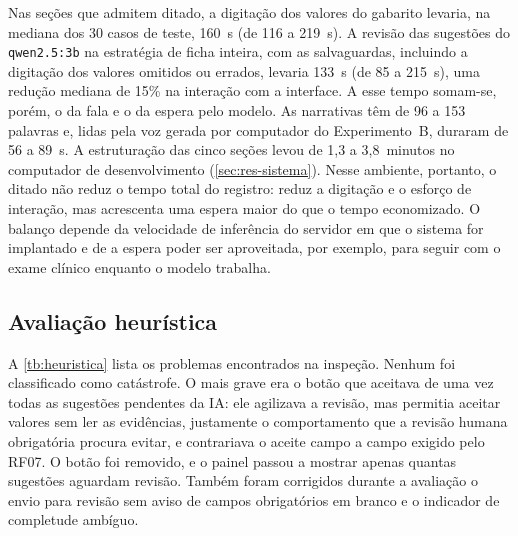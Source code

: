 Nas seções que admitem ditado, a digitação dos valores do gabarito levaria, na mediana dos 30 casos de teste, 160~s (de 116 a 219~s). A revisão das sugestões do \texttt{qwen2.5:3b} na estratégia de ficha inteira, com as salvaguardas, incluindo a digitação dos valores omitidos ou errados, levaria 133~s (de 85 a 215~s), uma redução mediana de 15\% na interação com a interface. A esse tempo somam-se, porém, o da fala e o da espera pelo modelo. As narrativas têm de 96 a 153 palavras e, lidas pela voz gerada por computador do Experimento~B, duraram de 56 a 89~s. A estruturação das cinco seções levou de 1,3 a 3,8~minutos no computador de desenvolvimento (\autoref{sec:res-sistema}). Nesse ambiente, portanto, o ditado não reduz o tempo total do registro: reduz a digitação e o esforço de interação, mas acrescenta uma espera maior do que o tempo economizado. O balanço depende da velocidade de inferência do servidor em que o sistema for implantado e de a espera poder ser aproveitada, por exemplo, para seguir com o exame clínico enquanto o modelo trabalha.

\subsection{Avaliação heurística}

A \autoref{tb:heuristica} lista os problemas encontrados na inspeção. Nenhum foi classificado como catástrofe. O mais grave era o botão que aceitava de uma vez todas as sugestões pendentes da IA: ele agilizava a revisão, mas permitia aceitar valores sem ler as evidências, justamente o comportamento que a revisão humana obrigatória procura evitar, e contrariava o aceite campo a campo exigido pelo RF07. O botão foi removido, e o painel passou a mostrar apenas quantas sugestões aguardam revisão. Também foram corrigidos durante a avaliação o envio para revisão sem aviso de campos obrigatórios em branco e o indicador de completude ambíguo.

